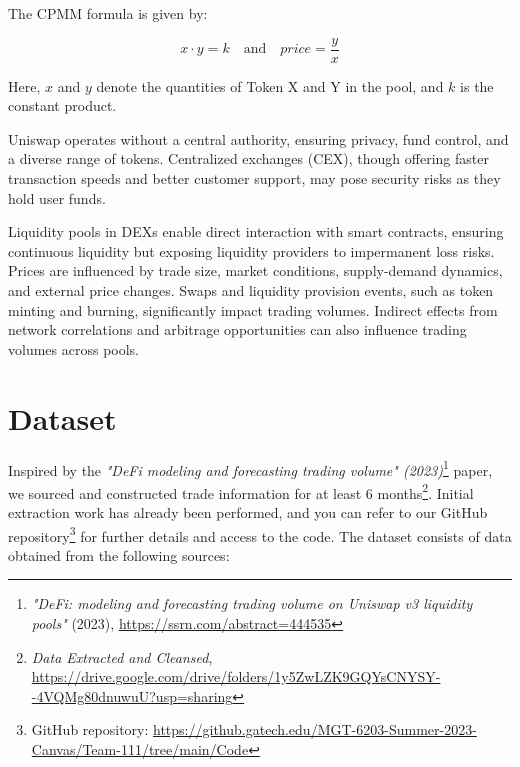 \documentclass{article}
\begin{document}
{The CPMM formula is given by:

\[x \cdot y = k \quad \text{and} \quad price = \frac{y}{x}\]

Here, \(x\) and \(y\) denote the quantities of Token X and Y in the pool, and \(k\) is the constant product.

Uniswap operates without a central authority, ensuring privacy, fund control, and a diverse range of tokens. Centralized exchanges (CEX), though offering faster transaction speeds and better customer support, may pose security risks as they hold user funds.

Liquidity pools in DEXs enable direct interaction with smart contracts, ensuring continuous liquidity but exposing liquidity providers to impermanent loss risks. Prices are influenced by trade size, market conditions, supply-demand dynamics, and external price changes. Swaps and liquidity provision events, such as token minting and burning, significantly impact trading volumes. Indirect effects from network correlations and arbitrage opportunities can also influence trading volumes across pools.


\section*{Dataset}

Inspired by the \textit{"DeFi modeling and forecasting trading volume" (2023)}\footnote{\textit{"DeFi: modeling and forecasting trading volume on Uniswap v3 liquidity pools"} (2023), \url{https://ssrn.com/abstract=444535}} paper, we sourced and constructed trade information for at least 6 months\footnote{\textit{Data Extracted and Cleansed}, \url{https://drive.google.com/drive/folders/1y5ZwLZK9GQYsCNYSY--4VQMg80dnuwuU?usp=sharing}}. Initial extraction work has already been performed, and you can refer to our GitHub repository\footnote{GitHub repository: \url{https://github.gatech.edu/MGT-6203-Summer-2023-Canvas/Team-111/tree/main/Code}} for further details and access to the code. The dataset consists of data obtained from the following sources:

}
\end{document}
